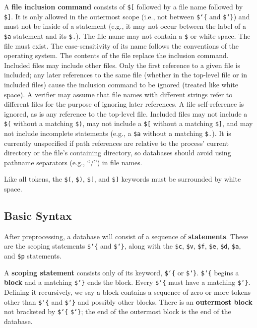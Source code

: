 A {\bf file inclusion command} consists of \texttt{\$[} followed by a file name
followed by \texttt{\$]}.
It is only allowed in the outermost scope (i.e., not between
\texttt{\$\char`\{} and \texttt{\$\char`\}})
and must not be inside of a statement (e.g., it may not occur
between the label of a \texttt{\$a} statement and its \texttt{\$.}).
The file name may not
contain a \texttt{\$} or white space.  The file must exist.
The case-sensitivity
of its name follows the conventions of the operating system.  The contents of
the file replace the inclusion command.
Included files may include other files.
Only the first reference to a given file is included; any later
references to the same file (whether in the top-level file or in included
files) cause the inclusion command to be ignored (treated like white space).
A verifier may assume that file names with different strings
refer to different files for the purpose of ignoring later references.
A file self-reference is ignored, as is any reference to the top-level file.
Included files may not include a \texttt{\$(} without a matching \texttt{\$)},
may not include a \texttt{\$[} without a matching \texttt{\$]}, and may
not include incomplete statements (e.g., a \texttt{\$a} without a matching
\texttt{\$.}).
It is currently unspecified if path references are relative to the process'
current directory or the file's containing directory, so databases should
avoid using pathname separators (e.g., ``/'') in file names.

Like all tokens, the \texttt{\$(}, \texttt{\$)}, \texttt{\$[}, and \texttt{\$]} keywords
must be surrounded by white space.

\subsection{Basic Syntax}

After preprocessing, a database will consist of a sequence of {\bf
statements}.
These are the scoping statements \texttt{\$\char`\{} and
\texttt{\$\char`\}}, along with the \texttt{\$c}, \texttt{\$v},
\texttt{\$f}, \texttt{\$e}, \texttt{\$d}, \texttt{\$a}, and \texttt{\$p}
statements.

A {\bf scoping statement} consists only of its
keyword, \texttt{\$\char`\{} or \texttt{\$\char`\}}. \texttt{\$\char`\{} begins a {\bf
block} and a matching \texttt{\$\char`\}} ends the block. Every \texttt{\$\char`\{}
must have a matching \texttt{\$\char`\}}. Defining it recursively, we say a block
contains a sequence of zero or more tokens other
than \texttt{\$\char`\{} and \texttt{\$\char`\}} and
possibly other blocks.  There is an {\bf outermost
block} not bracketed by \texttt{\$\char`\{} \texttt{\$\char`\}}; the end
of the outermost block is the end of the database.

